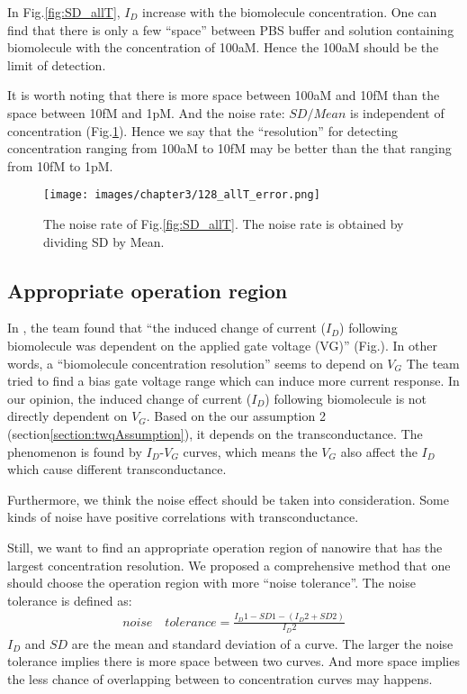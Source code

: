 In Fig.\ref{fig:SD_allT}, $I_D$ increase with the biomolecule concentration.
One can find that there is only a few ``space'' between PBS buffer and solution containing biomolecule with the concentration of 100aM.
Hence the 100aM should be the limit of detection.

It is worth noting that there is more space between 100aM and 10fM than the space between 10fM and 1pM.
And the noise rate: ${SD} / {Mean}$ is independent of concentration (Fig.\ref{fig:SD_allT2}).
Hence we say that the ``resolution'' for detecting concentration ranging from 100aM to 10fM may be better than the that ranging from 10fM to 1pM.
\begin{figure}[!htbp]
        \texttt{[image: images/chapter3/128\_allT\_error.png]}
    \caption{The noise rate of Fig.\ref{fig:SD_allT}. The noise rate is obtained by dividing SD by Mean.}
    \label{fig:SD_allT2}
\end{figure}

\subsection{Appropriate operation region} \label{section:biasVg}
In \cite{C6}, the team found that ``the induced change of current ($I_D$) following biomolecule was dependent on the applied gate voltage (VG)'' (Fig.).
In other words, a ``biomolecule concentration resolution'' seems to depend on $V_G$
The team tried to find a bias gate voltage range which can induce more current response.
In our opinion, the induced change of current ($I_D$) following biomolecule is not directly dependent on $V_G$.
Based on the our assumption 2 (section\ref{section:twqAssumption}), it depends on the transconductance.
The phenomenon is found by $I_D$-$V_G$ curves, which means the $V_G$ also affect the $I_D$ which cause different transconductance.

Furthermore, we think the noise effect should be taken into consideration.
Some kinds of noise have  positive correlations with transconductance.

Still, we want to find an appropriate operation region of nanowire that has the largest concentration resolution.
We proposed a comprehensive method that one should choose the operation region with more ``noise tolerance''.
The noise tolerance is defined as:
\setlength{\mathindent}{2cm}
\begin{align}
    noise \quad tolerance = \frac{I_D1 - SD1 - (I_D2 + SD2)}{I_D2}
\end{align}
$I_D$ and $SD$ are the mean and standard deviation of a curve.
The larger the noise tolerance implies there is more space between two curves.
And more space implies the less chance of overlapping between to concentration curves may happens.

